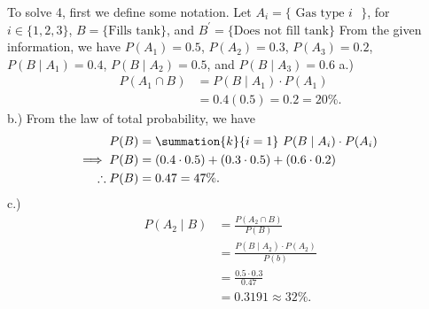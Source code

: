 \documentclass{report}
\begin{document}
    \bigbreak \noindent 
    To solve 4, first we define some notation. Let $A_{i} = \{\text{ Gas type $i$ }\}$, for $i\in \{1,2,3\}$, $B = \{ \text{Fills tank}\}$, and $B^{\prime} = \{\text{Does not fill tank}\} $
    \bigbreak \noindent 
    From the given information, we have $P(A_{1}) = 0.5$, $P(A_{2}) = 0.3$, $P(A_{3}) = 0.2$, $P(B \mid A_{1}) = 0.4$, $P(B \mid A_{2}) = 0.5$, and $P(B \mid A_{3}) = 0.6 $
    \bigbreak \noindent 
    a.)
    \begin{align*}
        P(A_{1} \cap B) &= P(B \mid A_{1}) \cdot P(A_{1}) \\
                        &=0.4(0.5) = 0.2 = 20\%
    .\end{align*}
    \bigbreak \noindent 
    b.)  From the law of total probability, we have
    \begin{align*}
        P(B) &= \summation{k}{i=1}\ P(B\mid A_{i}) \cdot P(A_{i})\ \\
        \implies P(B) &= (0.4 \cdot 0.5) + (0.3 \cdot 0.5) + (0.6 \cdot 0.2) \\
        \therefore P(B) &= 0.47 = 47\%
    .\end{align*}
    \bigbreak \noindent 
    c.)
    \begin{align*}
        P(A_{2} \mid B) &= \frac{P(A_{2} \cap B)}{P(B)}\\
        &=\frac{P(B\mid A_{2}) \cdot P(A_{2})}{P(b)} \\
        &= \frac{0.5\cdot 0.3}{0.47} \\
        &=0.3191 \approx 32\%
    .\end{align*}
\end{document}
